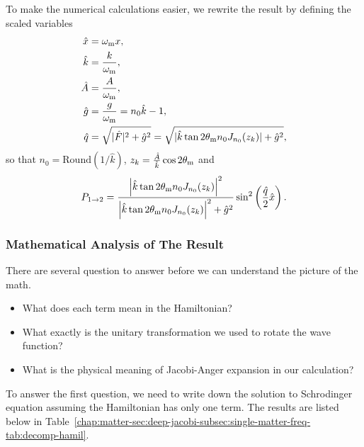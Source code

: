 To make the numerical calculations easier, we rewrite the result by defining the scaled variables
\begin{align}
   \hat x & = \omega_\mathrm m x,\\
   \hat k &= \frac{k}{\omega_\mathrm m}, \\
   \hat A & = \frac{A}{\omega_\mathrm m}, \\
   \hat g & = \frac{g}{\omega_\mathrm m} = n_0 \hat k - 1,\\
   \hat q &= \sqrt{ \lvert \hat F \rvert^2 + \hat g^2 } = \sqrt{ \lvert \hat k \tan 2\theta_\mathrm m n_0 J_{n_0} (z_k) \rvert + \hat g^2 },
\end{align}
so that $n_0 = \mathrm{Round}\left( 1/\hat k\right)$, $z_k=\frac{\hat A}{\hat k} \cos 2 \theta_\mathrm m$ and
\begin{equation}
   P_{1\to 2} = \frac{\left\lvert \hat k \tan 2\theta_\mm n_0 J_{n_0} (z_k) \right\rvert^2}{\left\lvert  \hat k \tan 2\theta_\mm n_0 J_{n_0} (z_k) \right\rvert^2 + \hat g ^2}\sin^2\left( \frac{ \hat q }{2} \hat x \right) .
   \label{chap:matter-sec:deep-jacobi-subsec:single-matter-freq-eqn:stimulated-single-freq-trans-probability}
\end{equation}



\subsubsection{Mathematical Analysis of The Result}


There are several question to answer before we can understand the picture of the math.
\begin{itemize}
    \item What does each term mean in the Hamiltonian?
\item What exactly is the unitary transformation we used to rotate the wave function?
\item What is the physical meaning of Jacobi-Anger expansion in our calculation?
\end{itemize}

To answer the first question, we need to write down the solution to Schrodinger equation assuming the Hamiltonian has only one term. The results are listed below in Table~\ref{chap:matter-sec:deep-jacobi-subsec:single-matter-freq-tab:decomp-hamil}.

